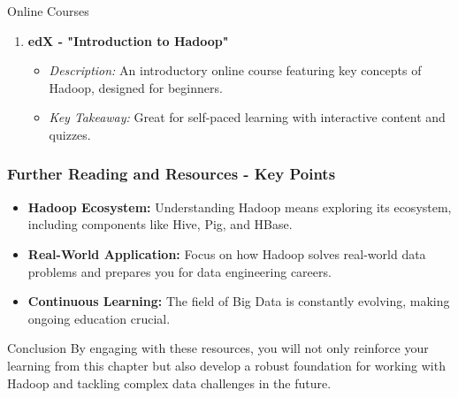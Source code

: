 \documentclass[aspectratio=169]{beamer}
\begin{document}
\begin{frame}[fragile]
\begin{block}{Online Courses}
\begin{enumerate}
            \item \textbf{edX - "Introduction to Hadoop"}
            \begin{itemize}
                \item \textit{Description:} An introductory online course featuring key concepts of Hadoop, designed for beginners.
                \item \textit{Key Takeaway:} Great for self-paced learning with interactive content and quizzes.
            \end{itemize}
        \end{enumerate}
    \end{block}
\end{frame}

\begin{frame}[fragile]
    \frametitle{Further Reading and Resources - Key Points}
    \begin{itemize}
        \item \textbf{Hadoop Ecosystem:} Understanding Hadoop means exploring its ecosystem, including components like Hive, Pig, and HBase.
        \item \textbf{Real-World Application:} Focus on how Hadoop solves real-world data problems and prepares you for data engineering careers.
        \item \textbf{Continuous Learning:} The field of Big Data is constantly evolving, making ongoing education crucial.
    \end{itemize}

    \begin{block}{Conclusion}
        By engaging with these resources, you will not only reinforce your learning from this chapter but also develop a robust foundation for working with Hadoop and tackling complex data challenges in the future.
    \end{block}
\end{frame}
\end{document}
